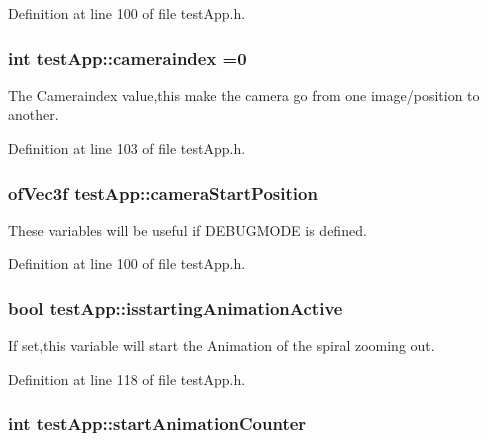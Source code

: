 Definition at line 100 of file test\-App.\-h.

\hypertarget{group___camera_ga4ca3a51642dedbf37f2b9f6ef96510c7}{
\subsubsection[{cameraindex}]{\setlength{\rightskip}{0pt plus 5cm}int test\-App\-::cameraindex =0}}\label{group___camera_ga4ca3a51642dedbf37f2b9f6ef96510c7}


The Cameraindex value,this make the camera go from one image/position to another. 



Definition at line 103 of file test\-App.\-h.

\hypertarget{group___camera_gac01013264b9988207e7fd9e0a486ff2f}{
\subsubsection[{camera\-Start\-Position}]{\setlength{\rightskip}{0pt plus 5cm}of\-Vec3f test\-App\-::camera\-Start\-Position}}\label{group___camera_gac01013264b9988207e7fd9e0a486ff2f}


These variables will be useful if D\-E\-B\-U\-G\-M\-O\-D\-E is defined. 



Definition at line 100 of file test\-App.\-h.

\hypertarget{group___camera_gab8a277e1055730fb5d6786ce0c4804b2}{
\subsubsection[{isstarting\-Animation\-Active}]{\setlength{\rightskip}{0pt plus 5cm}bool test\-App\-::isstarting\-Animation\-Active}}\label{group___camera_gab8a277e1055730fb5d6786ce0c4804b2}


If set,this variable will start the Animation of the spiral zooming out. 



Definition at line 118 of file test\-App.\-h.

\hypertarget{group___camera_ga577bf117cf10109de967ea0d3ca17f1f}{
\subsubsection[{start\-Animation\-Counter}]{\setlength{\rightskip}{0pt plus 5cm}int test\-App\-::start\-Animation\-Counter}}\label{group___camera_ga577bf117cf10109de967ea0d3ca17f1f}


